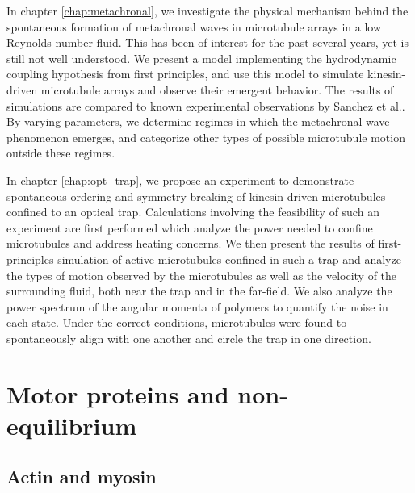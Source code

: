 \documentclass[11pt]{ucthesis}
\begin{document}
In chapter \ref{chap:metachronal}, we investigate the physical mechanism behind the spontaneous formation of metachronal
waves in microtubule arrays in a low Reynolds number fluid. This has been
of interest for the past several years, yet is still not well
understood. We present a model implementing the hydrodynamic coupling
hypothesis from first principles, and use this model to simulate
kinesin-driven microtubule arrays and observe their emergent behavior.
The results of simulations are compared to known experimental
observations by Sanchez et al.\cite{Sanchez2011,sanchez2013engineering}. By varying
parameters, we determine regimes in which the metachronal wave
phenomenon emerges, and categorize other types of possible microtubule
motion outside these regimes.

In chapter \ref{chap:opt_trap}, we propose an experiment to demonstrate spontaneous ordering and symmetry breaking of kinesin-driven microtubules confined to an optical trap. Calculations involving the feasibility of such an experiment are first performed which analyze the power needed to confine microtubules and address heating concerns. We then present the results of first-principles simulation of active microtubules confined in such a trap and analyze the types of motion observed by the microtubules as well as the velocity of the surrounding fluid, both near the trap and in the far-field. We also analyze the power spectrum of the angular momenta of polymers to quantify the noise in each state. Under the correct conditions, microtubules were found to spontaneously align with one another and circle the trap in one direction.

\section{Motor proteins and non-equilibrium}

\subsection{Actin and myosin}
\end{document}
